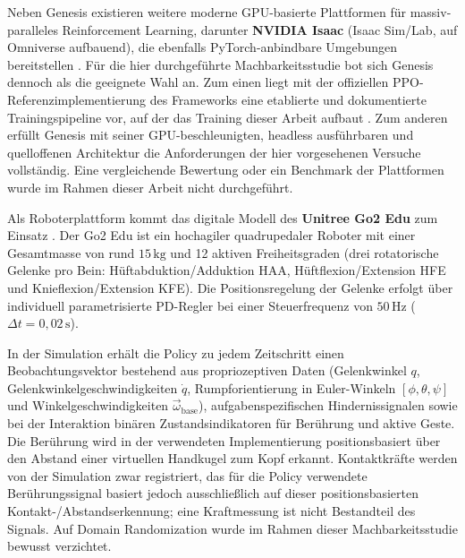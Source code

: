 Neben Genesis existieren weitere moderne GPU-basierte Plattformen für massiv-paralleles Reinforcement Learning, darunter \textbf{NVIDIA Isaac} (Isaac Sim/Lab, auf Omniverse aufbauend), die ebenfalls PyTorch-anbindbare Umgebungen bereitstellen \cite{mittal2025isaaclab}. Für die hier durchgeführte Machbarkeitsstudie bot sich Genesis dennoch als die geeignete Wahl an. Zum einen liegt mit der offiziellen PPO-Referenzimplementierung des Frameworks eine etablierte und dokumentierte Trainingspipeline vor, auf der das Training dieser Arbeit aufbaut \cite{authorsGenesisGenerativeUniversal2024}. Zum anderen erfüllt Genesis mit seiner GPU-beschleunigten, headless ausführbaren und quelloffenen Architektur die Anforderungen der hier vorgesehenen Versuche vollständig. Eine vergleichende Bewertung oder ein Benchmark der Plattformen wurde im Rahmen dieser Arbeit nicht durchgeführt.

Als Roboterplattform kommt das digitale Modell des \textbf{Unitree Go2 Edu} zum Einsatz \cite{unitreeGo2Unitree2023}. Der Go2 Edu ist ein hochagiler quadrupedaler Roboter mit einer Gesamtmasse von rund $15\,\text{kg}$ und 12 aktiven Freiheitsgraden (drei rotatorische Gelenke pro Bein: Hüftabduktion/Adduktion HAA, Hüftflexion/Extension HFE und Knieflexion/Extension KFE). Die Positionsregelung der Gelenke erfolgt über individuell parametrisierte PD-Regler bei einer Steuerfrequenz von $50\,\text{Hz}$ ($\Delta t = 0{,}02\,\text{s}$). 

In der Simulation erhält die Policy zu jedem Zeitschritt einen Beobachtungsvektor bestehend aus propriozeptiven Daten (Gelenkwinkel $q$, Gelenkwinkelgeschwindigkeiten $\dot{q}$, Rumpforientierung in Euler-Winkeln $[\phi, \theta, \psi]$ und Winkelgeschwindigkeiten $\vec{\omega}_{\text{base}}$), aufgabenspezifischen Hindernissignalen sowie bei der Interaktion binären Zustandsindikatoren für Berührung und aktive Geste. Die Berührung wird in der verwendeten Implementierung positionsbasiert über den Abstand einer virtuellen Handkugel zum Kopf erkannt. Kontaktkräfte werden von der Simulation zwar registriert, das für die Policy verwendete Berührungssignal basiert jedoch ausschließlich auf dieser positionsbasierten Kontakt-/Abstandserkennung; eine Kraftmessung ist nicht Bestandteil des Signals. Auf Domain Randomization wurde im Rahmen dieser Machbarkeitsstudie bewusst verzichtet.
